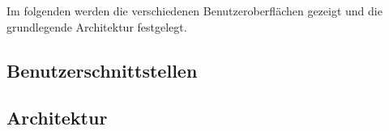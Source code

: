 Im folgenden werden die verschiedenen Benutzeroberflächen gezeigt und die grundlegende Architektur festgelegt.

\subsection{Benutzerschnittstellen}


\subsection{Architektur}
